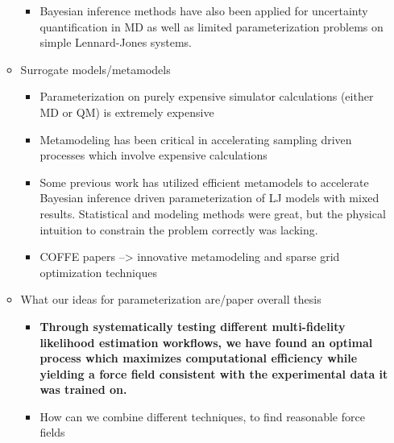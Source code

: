 \documentclass[aps,pre,nofootinbib,superscriptaddress,linenumbers,10pt, draft,tightenlines]{revtex4-1}
\begin{document}
\begin{itemize}
\begin{itemize}
\begin{itemize}
    		      \cite{bayes1,bayes2,bayes3,bayes5,bayes6,bayes7,bayes8,bayes_coarse} 
    		\item Bayesian inference methods have also been applied for uncertainty 
                  quantification in MD as well as limited parameterization
    		      problems on simple Lennard-Jones systems. \cite{bayes4,UQMDrizzi,LJexpBayes}
    	\end{itemize}
        \item Surrogate models/metamodels
        \begin{itemize}
            \item Parameterization on purely expensive simulator calculations (either MD or QM)
                  is extremely expensive
        	\item Metamodeling has been critical in accelerating sampling driven processes 
                  which involve expensive calculations \cite{mbar}
        	\item Some previous work has utilized efficient metamodels to accelerate Bayesian
                  inference driven parameterization of LJ models with mixed results. Statistical
                  and modeling methods were great, but the physical intuition to constrain the 
                  problem correctly was lacking. \cite{LJexpBayes}
    	    \item COFFE papers --> innovative metamodeling and sparse grid optimization 
                  techniques \cite{COFFE2016}    	    
        \end{itemize}    
        \item What our ideas for parameterization are/paper overall thesis
        \begin{itemize}
        	\item \textbf{Through systematically testing different multi-fidelity likelihood
                  estimation workflows, we have found an optimal process which 
        	      maximizes computational efficiency while yielding a force field consistent 
                  with the experimental data it was trained on.}
            \item How can we combine different techniques, to find reasonable force fields 

\end{itemize}
\end{itemize}
\end{itemize}
\end{document}
